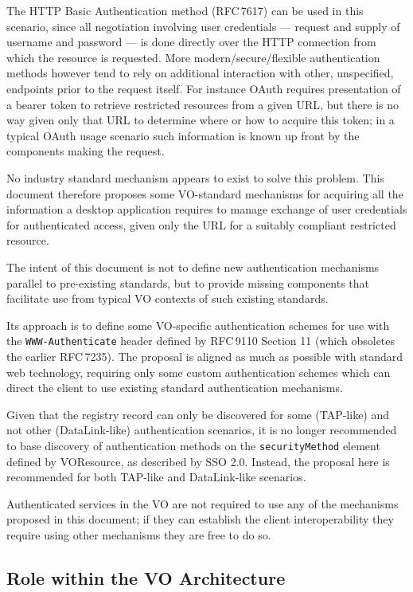 \documentclass[11pt,a4paper]{ivoa}
\newcommand{\rfc}[1]{RFC\,#1}
\newcommand{\header}[1]{{\tt #1}}
\begin{document}
The HTTP Basic Authentication method (\rfc{7617}) can be used in this scenario,
since all negotiation involving user credentials ---
request and supply of username and password ---
is done directly
over the HTTP connection from which the resource is requested.
More modern/secure/flexible authentication methods however tend to
rely on additional interaction with other, unspecified, endpoints
prior to the request itself.  For instance OAuth requires presentation
of a bearer token to retrieve restricted resources from a given URL,
but there is no way given only that URL to determine where or how
to acquire this token;
in a typical OAuth usage scenario such information is known up front
by the components making the request.

No industry standard mechanism appears to exist to solve this problem.
This document therefore proposes some VO-standard mechanisms for
acquiring all the information a desktop application requires
to manage exchange of user credentials for authenticated access,
given only the URL for a suitably compliant restricted resource.

The intent of this document is not to define new authentication
mechanisms parallel to pre-existing standards, but to provide
missing components that facilitate use from typical VO contexts
of such existing standards.

Its approach is to define some VO-specific authentication schemes
for use with the \header{WWW-Authenticate} header defined by
\rfc{9110} Section 11 (which obsoletes the earlier \rfc{7235}).
The proposal is aligned as much as possible with standard web
technology, requiring only some custom authentication schemes
which can direct the client to use existing standard authentication
mechanisms.

Given that the registry record can only be discovered for some
(TAP-like) and not other (DataLink-like) authentication scenarios,
it is no longer recommended to base discovery of authentication methods
on the {\tt securityMethod} element
defined by VOResource, as described by SSO 2.0.
Instead, the proposal here is recommended for both TAP-like and DataLink-like
scenarios.

Authenticated services in the VO are not required to use any of the  
mechanisms proposed in this document; if they can establish the
client interoperability they require using other mechanisms
they are free to do so.

\subsection{Role within the VO Architecture}
\end{document}
